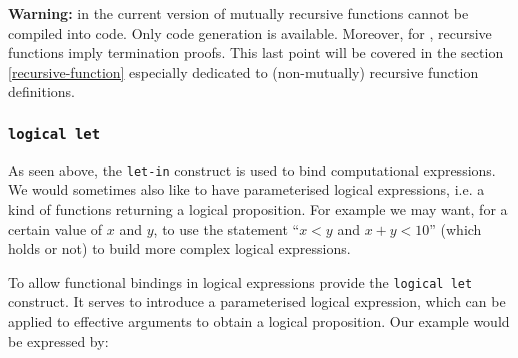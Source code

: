 {\large {\bf Warning:}} in the current version of {\focal} mutually
recursive functions cannot be compiled into {\coq} code. Only
{\ocaml} code generation is available. Moreover, for \coq, recursive
functions imply termination proofs. This last point will be covered in
the section \ref{recursive-function} especially dedicated to
(non-mutually) recursive function definitions.



\subsubsection{{\tt logical let}}
As seen above, the {\tt let-in} construct is used to bind
computational expressions. We would sometimes also like to have
parameterised logical expressions, i.e. a kind of functions returning
a logical proposition. For example we may want,  for a certain value
of $x$ and $y$, to use the statement ``$x<y$ and $x+y < 10$'' (which
holds or not) to build more complex logical expressions.






To allow functional bindings in logical expressions {\focal} provide
the {\tt logical let} construct. It serves to introduce a
parameterised logical expression,  which can be applied to effective
arguments to obtain a logical proposition.  Our example would be
expressed by:

